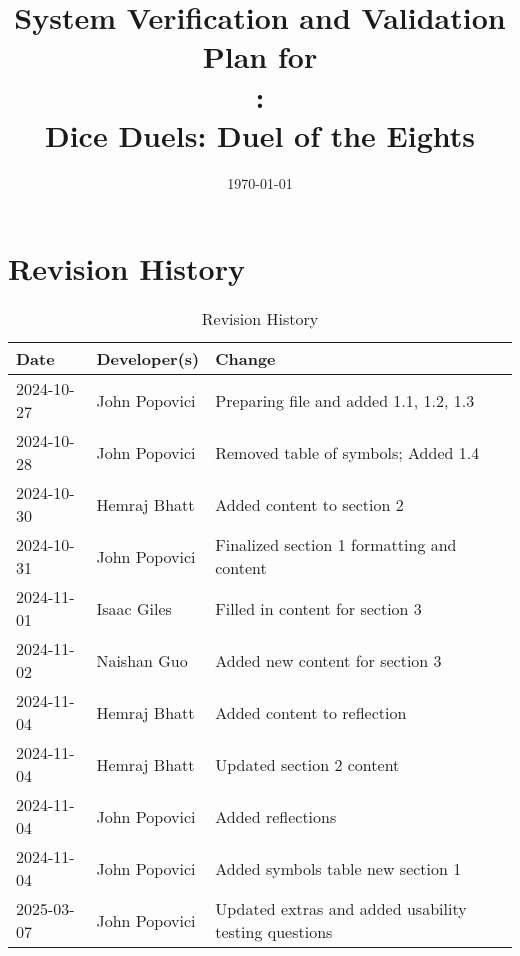 \documentclass[12pt, titlepage]{article}
\begin{document}
\title{System Verification and Validation Plan for \\\progname: \\Dice Duels: Duel of the Eights} 
\author{\authname}
\date{\today}
	
\maketitle


\section*{Revision History}

\begin{table}[hp]
\caption{Revision History} \label{TblRevisionHistory}
\begin{tabularx}{\textwidth}{llX}
\toprule
\textbf{Date} & \textbf{Developer(s)} & \textbf{Change}\\
\midrule
2024-10-27 & John Popovici & Preparing file and added 1.1, 1.2, 1.3\\
2024-10-28 & John Popovici & Removed table of symbols; Added 1.4\\
2024-10-30 & Hemraj Bhatt & Added content to section 2\\
2024-10-31 & John Popovici & Finalized section 1 formatting and content\\
2024-11-01 & Isaac Giles & Filled in content for section 3\\
2024-11-02 & Naishan Guo & Added new content for section 3\\
2024-11-04 & Hemraj Bhatt & Added content to reflection \\
2024-11-04 & Hemraj Bhatt & Updated section 2 content \\
2024-11-04 & John Popovici & Added reflections \\
2024-11-04 & John Popovici & Added symbols table new section 1 \\
2025-03-07 & John Popovici & Updated extras and added usability testing questions \\
\bottomrule
\end{tabularx}
\end{table}

~\\
\iffalse
{}
\end{document}
